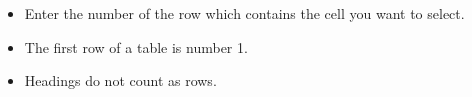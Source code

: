 \begin{itemize}
\item Enter the number of the row which contains the cell you want to select.
\item The first row of a table is number 1.
\item Headings do not count as rows. 
\end{itemize}

